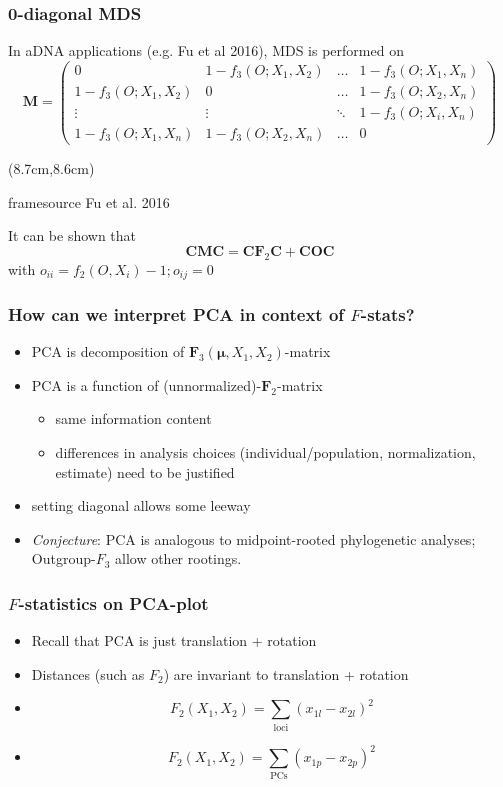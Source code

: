 \documentclass[11pt]{beamer}
\newcommand{\MC}{\mathbf{C}} %
\newcommand{\MF}{\mathbf{F}_2} %
\newcommand{\MFT}{\mathbf{F}_3} %
\newcommand{\MEAN}{\boldsymbol{\mu}} %
\newcommand{\source}[1]{\begin{textblock*}{4cm}(8.7cm,8.6cm)
		\begin{beamercolorbox}[ht=0.5cm,right]{framesource}
			\usebeamerfont{framesource}\usebeamercolor[fg]{framesource} {#1}
		\end{beamercolorbox}
\end{textblock*}}
\begin{document}
\begin{frame}
\frametitle{0-diagonal MDS}
In aDNA applications (e.g. Fu et al 2016), MDS is performed on
\small{
$$\mathbf{M} = 
\begin{pmatrix}
0                     & 1 - f_3(O; X_1, X_2) & \dots & 1 - f_3(O; X_1, X_n)\\
 1 - f_3(O; X_1, X_2) & 0 &                    \dots & 1 - f_3(O; X_2, X_n)\\
 \vdots &             \vdots                 & \ddots& 1 - f_3(O; X_i, X_n)\\
 1 - f_3(O; X_1, X_n) & 1 - f_3(O; X_2, X_n)   & \dots & 0
\end{pmatrix}
$$}\source{Fu et al. 2016}
It can be shown that 
$$\MC\mathbf{M}\MC = \MC\MF\MC + \MC\mathbf{O}\MC$$
with $o_{ii} = f_2(O, X_i) - 1; o_{ij} = 0$
\end{frame}


\begin{frame}
\frametitle{How can we interpret PCA in context of $F$-stats?}
\begin{itemize}
	\item PCA is decomposition of $\MFT(\MEAN, X_1, X_2)$-matrix
	\item PCA is a function of (unnormalized)-$\MF$-matrix
	\begin{itemize}
		\item same information content
		\item differences in analysis choices (individual/population, normalization, estimate) need to be justified
	\end{itemize}
	\item<2-> setting diagonal allows some leeway
	\item<3-> \emph{Conjecture}: PCA is analogous to midpoint-rooted phylogenetic analyses; Outgroup-$F_3$ allow other rootings.

	
\end{itemize}
\end{frame}


\begin{frame}
\frametitle{$F$-statistics on PCA-plot}
\begin{itemize}
	\item Recall that PCA is just translation + rotation
	\item<2-> Distances (such as $F_2$) are invariant to translation + rotation
	\item<3-> $$F_2(X_1, X_2) = \sum_{\text{loci}}(x_{1l} - x_{2l})^2$$
	\item<4-> $$F_2(X_1, X_2) = \sum_{\text{PCs}}(x_{1p} - x_{2p})^2$$	
\end{itemize}
\end{frame}
\end{document}

